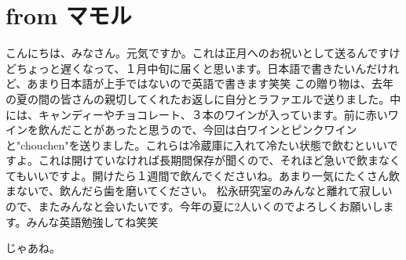 \documentclass[11pt,a4paper]{jsarticle}
\begin{document}
%
%
\section*{from マモル}
こんにちは、みなさん。元気ですか。これは正月へのお祝いとして送るんですけどちょっと遅くなって、１月中旬に届くと思います。日本語で書きたいんだけれど、あまり日本語が上手ではないので英語で書きます笑笑
この贈り物は、去年の夏の間の皆さんの親切してくれたお返しに自分とラファエルで送りました。中には、キャンディーやチョコレート、３本のワインが入っています。前に赤いワインを飲んだことがあったと思うので、今回は白ワインとピンクワインと"chouchen"を送りました。これらは冷蔵庫に入れて冷たい状態で飲むといいですよ。これは開けていなければ長期間保存が聞くので、それほど急いで飲まなくてもいいですよ。開けたら１週間で飲んでくださいね。あまり一気にたくさん飲まないで、飲んだら歯を磨いてください。
松永研究室のみんなと離れて寂しいので、またみんなと会いたいです。今年の夏に2人いくのでよろしくお願いします。みんな英語勉強してね笑笑

じゃあね。
%
%
\end{document}
